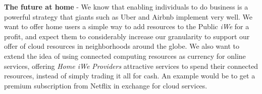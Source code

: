 \textbf{The future at home} - We know that enabling individuals to do business
is a powerful strategy that giants such as Uber and Airbnb implement very well.
We want to offer home users a simple way to add resources to the Public
\textit{iWe} for a profit, and expect them to considerably increase our
granularity to support our offer of cloud resources in neighborhoods around the
globe.  We also want to extend the idea of using connected computing resources
as currency for online services, offering \textit{Home iWe Providers}
attractive services to spend their connected resources, instead of simply
trading it all for cash. An example would be to get a premium subscription from
Netflix in exchange for cloud services.
